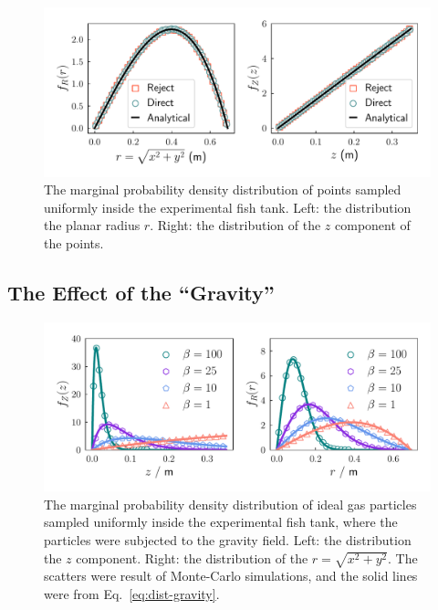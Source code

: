 \documentclass[11pt,twoside]{report}
\begin{document}
\begin{figure}
  \includegraphics[width=\linewidth]{density-tank}
  \caption[The 3D geometry of the experimental fish tank]{
  The marginal probability density distribution of points sampled uniformly inside the experimental fish tank.
  Left: the distribution the planar radius $r$.
  Right: the distribution of the $z$ component of the points.
  }
  \label{fig:dist-tank}
\end{figure}


\subsection{The Effect of the ``Gravity''}
\label{section:sim-mc-gravity}

\begin{figure}
  \includegraphics[width=\linewidth]{density-gravity}
  \caption[The distribution of ideal gas in the tank subjected to gravity]{The marginal probability density distribution of ideal gas particles sampled uniformly inside the experimental fish tank, where the particles were subjected to the gravity field. Left: the distribution the $z$ component. Right: the distribution of the $r = \sqrt{x^2 + y^2}$. The scatters were result of Monte-Carlo simulations, and the solid lines were from Eq.~\ref{eq:dist-gravity}.}
  \label{fig:dist-gravity}
\end{figure}
\end{document}
